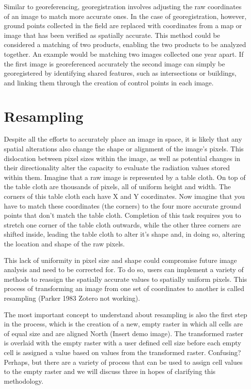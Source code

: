 \documentclass[
]{book}
\begin{document}
Similar to georeferencing, georegistration involves adjusting the raw
coordinates of an image to match more accurate ones. In the case of
georegistration, however, ground points collected in the field are
replaced with coordinates from a map or image that has been verified as
spatially accurate. This method could be considered a matching of two
products, enabling the two products to be analyzed together. An example
would be matching two images collected one year apart. If the first
image is georeferenced accurately the second image can simply be
georegistered by identifying shared features, such as intersections or
buildings, and linking them through the creation of control points in
each image.

\hypertarget{resampling}{%
\section{\texorpdfstring{\textbf{Resampling}}{Resampling}}\label{resampling}}

Despite all the efforts to accurately place an image in space, it is
likely that any spatial alterations also change the shape or alignment
of the image's pixels. This dislocation between pixel sizes within the
image, as well as potential changes in their directionality alter the
capacity to evaluate the radiation values stored within them. Imagine
that a raw image is represented by a table cloth. On top of the table
cloth are thousands of pixels, all of uniform height and width. The
corners of this table cloth each have X and Y coordinates. Now imagine
that you have to match these coordinates (the corners) to the four more
accurate ground points that don't match the table cloth. Completion of
this task requires you to stretch one corner of the table cloth
outwards, while the other three corners are shifted inside, leading the
table cloth to alter it's shape and, in doing so, altering the location
and shape of the raw pixels.

This lack of uniformity in pixel size and shape could compromise future
image analysis and need to be corrected for. To do so, users can
implement a variety of methods to reassign the spatially accurate values
to spatially uniform pixels. This process of transforming an image from
one set of coordinates to another is called resampling (Parker 1983
Zotero not working).

The most important concept to understand about resampling is also the
first step in the process, which is the creation of a new, empty raster
in which all cells are of equal size and are aligned North (Insert demo
image). The transformed raster is overlaid with the empty raster with a
user defined cell size before each empty cell is assigned a value based
on values from the transformed raster. Confusing? Perhaps, but there are
a variety of process that can be used to assign cell values to the empty
raster and we will discuss three in hopes of clarifying this
methodology.
\end{document}
